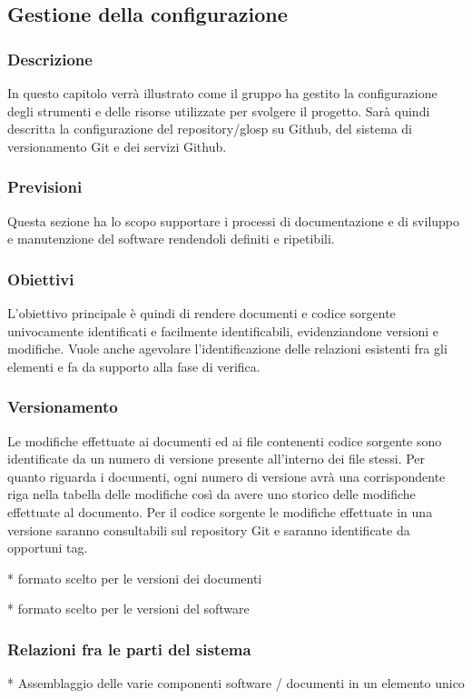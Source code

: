 \subsection{Gestione della configurazione}
	\subsubsection{Descrizione}
		In questo capitolo verrà illustrato come il gruppo ha gestito la configurazione degli strumenti e delle risorse utilizzate per svolgere il progetto.
		Sarà quindi descritta la configurazione del repository/glosp su Github, del sistema di versionamento Git e dei servizi Github.
	\subsubsection{Previsioni}
		Questa sezione ha lo scopo supportare i processi di documentazione e di sviluppo e manutenzione del software rendendoli definiti e ripetibili.  
	\subsubsection{Obiettivi} 
		L'obiettivo principale è quindi di rendere documenti e codice sorgente univocamente identificati e facilmente identificabili, evidenziandone versioni e modifiche. Vuole anche agevolare l'identificazione delle relazioni esistenti fra gli elementi e fa da supporto alla fase di verifica.
	\subsubsection{Versionamento}
		Le modifiche effettuate ai documenti ed ai file contenenti codice sorgente sono identificate da un numero di versione presente all'interno dei file stessi. Per quanto riguarda i documenti, ogni numero di versione avrà una corrispondente riga nella tabella delle modifiche così da avere uno storico delle modifiche effettuate al documento. Per il codice sorgente le modifiche effettuate in una versione saranno consultabili sul repository Git e saranno identificate da opportuni tag.
		
		* formato scelto per le versioni dei documenti
		
		* formato scelto per le versioni del software
		
	\subsubsection{Relazioni fra le parti del sistema}
		* Assemblaggio delle varie componenti software / documenti in un elemento unico
		
